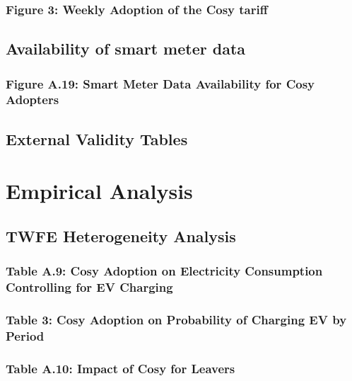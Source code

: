 \documentclass[
]{article}
\begin{document}
\subsubsection{Figure 3: Weekly Adoption of the Cosy tariff}\label{figure-3-weekly-adoption-of-the-cosy-tariff}

\subsection{Availability of smart meter data}\label{availability-of-smart-meter-data}

\subsubsection{Figure A.19: Smart Meter Data Availability for Cosy Adopters}\label{figure-a.19-smart-meter-data-availability-for-cosy-adopters}

\subsection{External Validity Tables}\label{external-validity-tables}

\section{Empirical Analysis}\label{sec:results}

\subsection{TWFE Heterogeneity Analysis}\label{twfe-heterogeneity-analysis}

\subsubsection{Table A.9: Cosy Adoption on Electricity Consumption Controlling for EV Charging}\label{table-a.9-cosy-adoption-on-electricity-consumption-controlling-for-ev-charging}

\subsubsection{Table 3: Cosy Adoption on Probability of Charging EV by Period}\label{table-3-cosy-adoption-on-probability-of-charging-ev-by-period}

\subsubsection{Table A.10: Impact of Cosy for Leavers}\label{table-a.10-impact-of-cosy-for-leavers}
\end{document}
